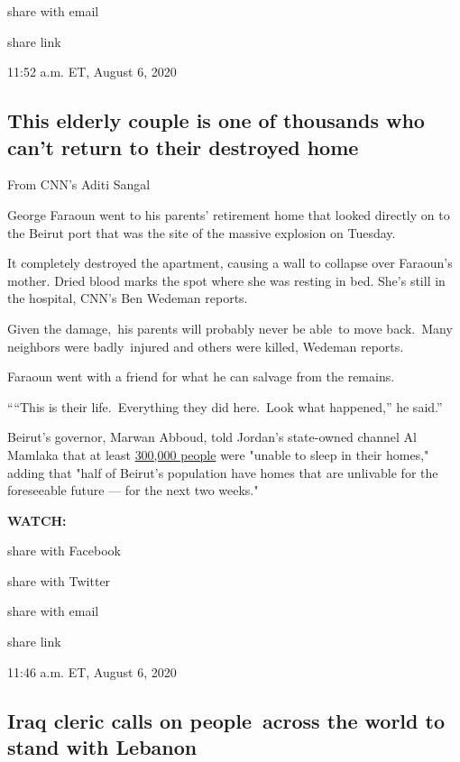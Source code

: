 share with email

share link

11:52 a.m. ET, August 6, 2020

\hypertarget{this-elderly-couple-is-one-of-thousands-who-cant-return-to-their-destroyed-home}{%
\subsection{This elderly couple is one of thousands who can't return to
their destroyed
home}\label{this-elderly-couple-is-one-of-thousands-who-cant-return-to-their-destroyed-home}}

From CNN's Aditi Sangal

George Faraoun went to his parents' retirement home that looked directly
on to the Beirut port that was the site of the massive explosion on
Tuesday.

It completely destroyed the apartment, causing a wall to collapse over
Faraoun's mother. Dried blood marks the spot where she was resting in
bed. She's still in the hospital, CNN's Ben Wedeman reports.

Given the damage,~his parents will probably never be able~to move
back.~Many neighbors were badly~injured and others were killed, Wedeman
reports.

Faraoun went with a friend for what he can salvage from the remains.

````This is their life.~Everything they did here.~Look what happened,''
he said.''

Beirut's governor, Marwan Abboud, told Jordan's state-owned channel Al
Mamlaka that at least
\href{https://www.cnn.com/2020/08/05/middleeast/beirut-blast-explainer-intl-hnk/index.html}{300,000
people} were "unable to sleep in their homes," adding that "half of
Beirut's population have homes that are unlivable for the foreseeable
future --- for the next two weeks."

\textbf{WATCH:}

share with Facebook

share with Twitter

share with email

share link

11:46 a.m. ET, August 6, 2020

\hypertarget{iraq-cleric-calls-on-people-across-the-world-to-stand-with-lebanon-}{%
\subsection{Iraq cleric calls on people~across the world to stand with
Lebanon~}\label{iraq-cleric-calls-on-people-across-the-world-to-stand-with-lebanon-}}

